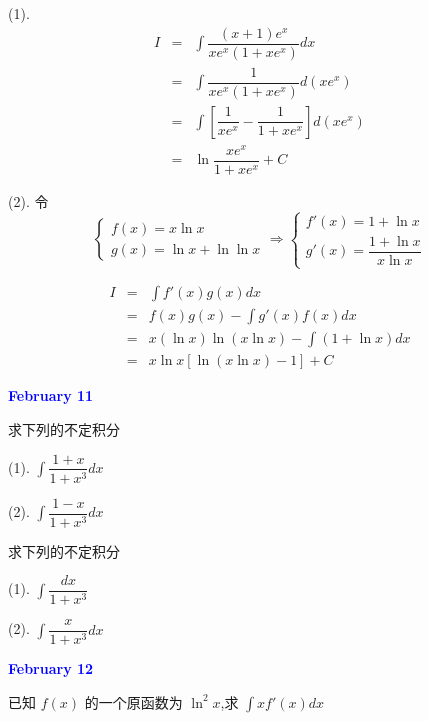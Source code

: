 \begin{solution}

	(1). 
	\begin{eqnarray*}
		I & = & \int \dfrac{(x+1)e^{x}}{xe^{x}(1+xe^{x})}dx\\
		  & = & \int \dfrac{1}{xe^{x}(1+xe^{x})}d(xe^{x})\\
		  & = & \int \left[\dfrac{1}{xe^{x}}-\dfrac{1}{1+xe^{x}}\right]d(xe^{x})\\
		  & = & \ln \dfrac{xe^{x}}{1+xe^{x}} +C
	\end{eqnarray*}

	(2). 令 
	$$\begin{cases}
		f(x) = x\ln x \\ 
		g(x) = \ln x+\ln \ln x
	\end{cases}\Rightarrow 
	\begin{cases} 
		f'(x) = 1+\ln x\\
		g'(x) = \dfrac{1+\ln x}{x\ln x}
	\end{cases}$$
	
	\begin{eqnarray*}
		I & = & \int f'(x)g(x)dx\\
		  & = & f(x)g(x) - \int g'(x)f(x)dx\\
		  & = & x(\ln x)\ln(x\ln x) - \int (1+\ln x)dx\\
		  & = & x\ln x\left[\ln(x\ln x) - 1 \right] + C
	\end{eqnarray*}
\end{solution}

\textcolor{blue}{\textbf{February 11}}
\begin{example}[][Exam: 28.2.7]
	求下列的不定积分

(1). $\displaystyle{\int \dfrac{1+x}{1+x^{3}}dx}$

(2). $\displaystyle{\int \dfrac{1-x}{1+x^{3}}dx}$
\end{example}

\begin{example}[][Exam: 28.2.8]
	求下列的不定积分

(1). $\displaystyle{\int \dfrac{dx}{1+x^{3}}}$

(2). $\displaystyle{\int \dfrac{x}{1+x^{3}}dx}$
\end{example}

\textcolor{blue}{\textbf{February 12}}

\begin{example}[][Exam: 28.2.9]
	已知 $f(x)$ 的一个原函数为 $\ln^{2}x$,求 $\int xf'(x)dx$
\end{example}

